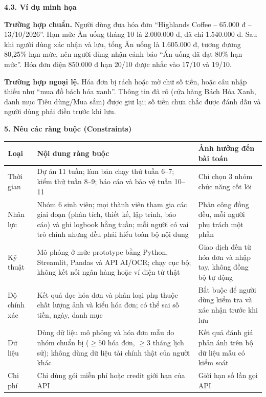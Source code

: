 \documentclass[a4paper,14pt]{extarticle}
\renewcommand{\arraystretch}{1.08}
\newcommand{\TableText}{\footnotesize}
\newcommand{\TableStart}{%
    \begingroup
    \TableText
    \renewcommand{\arraystretch}{1.05}
}
\newcommand{\TableEnd}{\endgroup}
\begin{document}
\newpage

\vspace{0.5cm}

{\normalsize\bfseries 4.3. Ví dụ minh họa}

\textbf{Trường hợp chuẩn.} Người dùng đưa hóa đơn
``Highlands Coffee -- 65.000 đ -- 13/10/2026''. Hạn mức Ăn uống
tháng 10 là 2.000.000 đ, đã chi 1.540.000 đ. Sau khi người dùng
xác nhận và lưu, tổng Ăn uống là 1.605.000 đ, tương đương
80,25\% hạn mức, nên người dùng nhận cảnh báo
``Ăn uống đã đạt 80\% hạn mức''. Hóa đơn điện 850.000 đ hạn
20/10 được nhắc vào 17/10 và 19/10.

\textbf{Trường hợp ngoại lệ.} Hóa đơn bị rách hoặc mờ chữ số
tiền, hoặc câu nhập thiếu như ``mua đồ bách hóa xanh''. Thông
tin đã rõ (cửa hàng Bách Hóa Xanh, danh mục Tiêu dùng/Mua sắm)
được giữ lại; số tiền chưa chắc được đánh dấu và người dùng
phải điền trước khi lưu.

\vspace{0.5cm}

{\normalsize\bfseries 5. Nêu các ràng buộc (Constraints)}

\TableStart
\begingroup
\normalsize
\begin{tabularx}{\textwidth}{
    |P{3.5cm}|P{9cm}|Y|
}
\hline
\textbf{Loại}
& \textbf{Nội dung ràng buộc}
& \textbf{Ảnh hưởng đến bài toán}
\\
\hline
Thời gian
& Dự án 11 tuần; làm bản chạy thử tuần 6--7; kiểm thử tuần 8--9; báo cáo và bảo vệ tuần 10--11
& Chỉ chọn 3 nhóm chức năng cốt lõi
\\
\hline
Nhân lực
& Nhóm 6 sinh viên; mọi thành viên tham gia các giai đoạn (phân tích, thiết kế, lập trình, báo cáo) và ghi logbook hằng tuần; mỗi người có vai trò chính nhưng đều phải hiểu toàn bộ nội dung
& Phân công đồng đều, mỗi người phụ trách một phần
\\
\hline
Kỹ thuật
& Mô phỏng ở mức prototype bằng Python, Streamlit, Pandas và API AI/OCR; chạy cục bộ; không kết nối ngân hàng hoặc ví điện tử thật
& Giao dịch đến từ hóa đơn và nhập tay, không đồng bộ tự động
\\
\hline
Độ chính xác
& Kết quả đọc hóa đơn và phân loại phụ thuộc chất lượng ảnh và kiểu hóa đơn; có thể sai số tiền, ngày, danh mục
& Bắt buộc để người dùng kiểm tra và xác nhận trước khi lưu
\\
\hline
Dữ liệu
& Dùng dữ liệu mô phỏng và hóa đơn mẫu do nhóm chuẩn bị ($\geq 50$ hóa đơn, $\geq 3$ tháng lịch sử); không dùng dữ liệu tài chính thật của người khác
& Kết quả đánh giá phản ánh trên bộ dữ liệu mẫu có kiểm soát
\\
\hline
Chi phí
& Chỉ dùng gói miễn phí hoặc credit giới hạn của API
& Giới hạn số lần gọi API
\\
\hline
\end{tabularx}
\endgroup
\TableEnd
\end{document}
